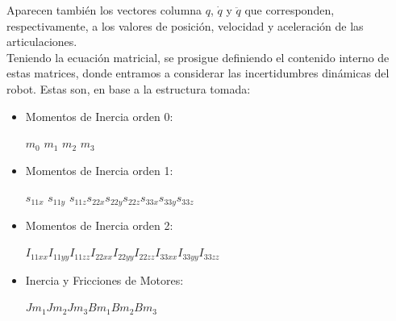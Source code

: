 Aparecen también los vectores columna $q$, $\dot{q}$ y $\ddot{q}$ que corresponden, respectivamente, a los valores de posición, velocidad y aceleración de las articulaciones.\\



Teniendo la ecuación matricial, se prosigue definiendo el contenido interno de estas matrices, donde entramos a considerar las incertidumbres dinámicas del robot. Estas son, en base a la estructura tomada:

\vspace{0.3cm}

\begin{itemize}
	\item Momentos de Inercia orden 0:
	\begin{center}
		$ m_0$ \hspace{0.2cm} $m_1$\hspace{0.2cm} $m_2$ \hspace{0.2cm}$m_3$
	\end{center}
	\item Momentos de Inercia orden 1:
	\begin{center}
		$ s_{11x}$\hspace{0.2cm} $s_{11y}$\hspace{0.2cm} $s_{11z}$\hspace{0.2cm}$ s_{22x}$\hspace{0.2cm}$ s_{22y}$\hspace{0.2cm}$ s_{22z}$\hspace{0.2cm}$ s_{33x}$\hspace{0.2cm}$ s_{33y}$\hspace{0.2cm}$ s_{33z} $
	\end{center}
	\item Momentos de Inercia orden 2:
	\begin{center}
		$ I_{11xx} $\hspace{0.2cm}$I_{11yy}$\hspace{0.2cm}$ I_{11zz}$\hspace{0.2cm}$ I_{22xx}$\hspace{0.2cm}$ I_{22yy}$\hspace{0.2cm}$ I_{22zz}$\hspace{0.2cm}$ I_{33xx}$\hspace{0.2cm}$ I_{33yy}$\hspace{0.2cm}$ I_{33zz} $
	\end{center}
	\item Inercia y Fricciones de Motores:
	\begin{center}
		$Jm_1$\hspace{0.2cm}$ Jm_2 $\hspace{0.2cm}$Jm_3$\hspace{0.2cm}$ Bm_1$\hspace{0.2cm}$ Bm_2$\hspace{0.2cm}$ Bm_3$
	\end{center}
\end{itemize}
\newpage


